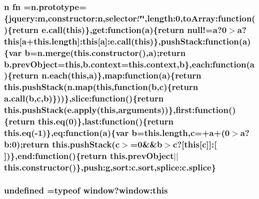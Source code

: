 \subsubsection[{\texorpdfstring{fn}{fn}}]{\setlength{\rightskip}{0pt plus 5cm}n fn ={\bf n.\+prototype}=\{jquery\+:m,constructor\+:n,selector\+:\char`\"{}\char`\"{},length\+:0,to\+Array\+:function()\{return e.\+call(this)\},get\+:function({\bf a})\{return null!={\bf a}?0$>${\bf a}?this\mbox{[}{\bf a}+{\bf this.\+length}\mbox{]}\+:this\mbox{[}{\bf a}\mbox{]}\+:e.\+call(this)\},push\+Stack\+:function({\bf a})\{var {\bf b}={\bf n.\+merge}({\bf this.\+constructor}(),{\bf a});return b.\+prev\+Object=this,b.\+context=this.\+context,{\bf b}\},each\+:function({\bf a})\{return {\bf n.\+each}(this,{\bf a})\},map\+:function({\bf a})\{return {\bf this.\+push\+Stack}({\bf n.\+map}(this,function({\bf b},{\bf c})\{return a.\+call({\bf b},{\bf c},{\bf b})\}))\},slice\+:function()\{return {\bf this.\+push\+Stack}(e.\+apply(this,arguments))\},first\+:function()\{return {\bf this.\+eq}(0)\},last\+:function()\{return {\bf this.\+eq}(-\/1)\},eq\+:function({\bf a})\{var {\bf b}={\bf this.\+length},{\bf c}=+{\bf a}+(0$>${\bf a}?b\+:0);return {\bf this.\+push\+Stack}({\bf c}$>$=0\&\&{\bf b}$>${\bf c}?\mbox{[}this\mbox{[}{\bf c}\mbox{]}\mbox{]}\+:\mbox{[}$\,$\mbox{]})\},end\+:function()\{return this.\+prev\+Object$\vert$$\vert${\bf this.\+constructor}()\},push\+:g,sort\+:c.\+sort,splice\+:c.\+splice\}}\hypertarget{jquery-2_82_80_8min_8js_a4f0af84f62a6e2f4aee1d072192b48ec}{}\label{jquery-2_82_80_8min_8js_a4f0af84f62a6e2f4aee1d072192b48ec}
\subsubsection[{\texorpdfstring{undefined}{undefined}}]{\setlength{\rightskip}{0pt plus 5cm}undefined =typeof {\bf window}?window\+:this}\hypertarget{jquery-2_82_80_8min_8js_ae21cc36bf0d65014c717a481a3f8a468}{}\label{jquery-2_82_80_8min_8js_ae21cc36bf0d65014c717a481a3f8a468}
